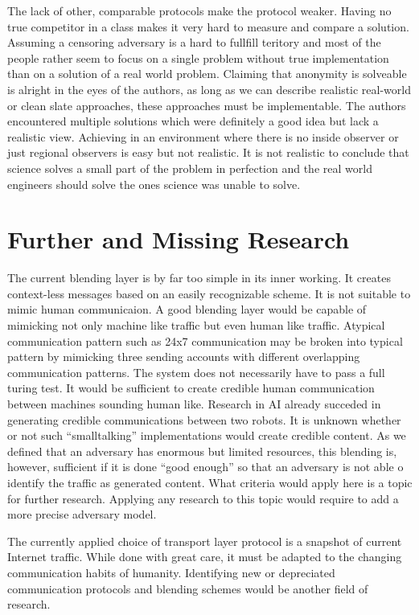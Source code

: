 The lack of other, comparable protocols make the \MessageVortex{} protocol weaker. Having no true competitor in a class makes it very hard to measure and compare a solution. Assuming a censoring adversary is a hard to fullfill teritory and most of the people rather seem to focus on a single problem without true implementation than on a solution of a real world problem. Claiming that anonymity is solveable is alright in the eyes of the authors, as long as we can describe realistic real-world or clean slate approaches, these approaches must be implementable. The authors encountered multiple solutions which were definitely a good idea but lack a realistic view. Achieving in an environment where there is no inside observer or just regional observers is easy but not realistic. It is not realistic to conclude that science solves a small part of the problem in perfection and the real world engineers should solve the ones science was unable to solve.

\section{Further and Missing Research}
The current blending layer is by far too simple in its inner working. It creates context-less messages based on an easily recognizable scheme. It is not suitable to mimic human communicaion. A good blending layer would be capable of mimicking not only machine like traffic but even human like traffic. Atypical communication pattern such as 24x7 communication may be broken into typical pattern by mimicking three sending accounts with different overlapping communication patterns. The system does not necessarily have to pass a full turing test. It would be sufficient to create credible human communication between machines sounding human like. Research in AI already succeded in generating credible communications between two robots. It is unknown whether or not such ``smalltalking'' implementations would create credible content. As we defined that an adversary has enormous but limited resources, this blending is, however, sufficient if it is done ``good enough'' so that an adversary is not able o identify the traffic as generated content. What criteria would apply here is a topic for further research. Applying any research to this topic would require to add a more precise adversary model.

The currently applied choice of transport layer protocol is a snapshot of current Internet traffic. While done with great care, it must be adapted to the changing communication habits of humanity. Identifying new or depreciated communication protocols and blending schemes would be another field of research.

